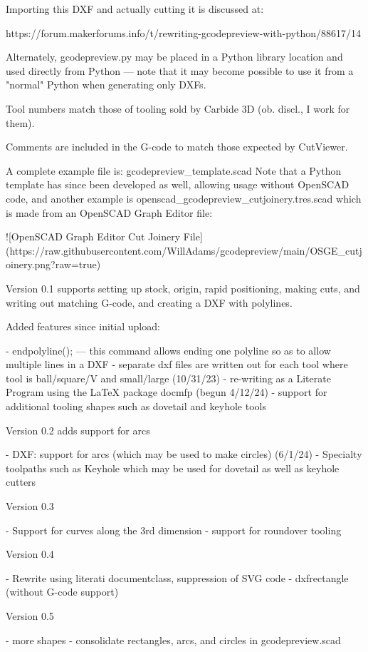 \documentclass{ltxdoc}
\begin{document}
\begin{readme}
Importing this DXF and actually cutting it is discussed at:

https://forum.makerforums.info/t/rewriting-gcodepreview-with-python/88617/14

Alternately, gcodepreview.py may be placed in a Python library location and used directly from Python --- note that it may become possible to use it from a "normal" Python when generating only DXFs.

Tool numbers match those of tooling sold by Carbide 3D (ob. discl., I work for them). 

Comments are included in the G-code to match those expected by CutViewer.

A complete example file is: gcodepreview_template.scad Note that a Python template has since been developed as well, allowing usage without OpenSCAD code, and another example is openscad_gcodepreview_cutjoinery.tres.scad which is made from an OpenSCAD Graph Editor file:

![OpenSCAD Graph Editor Cut Joinery File](https://raw.githubusercontent.com/WillAdams/gcodepreview/main/OSGE_cutjoinery.png?raw=true)

Version 0.1 supports setting up stock, origin, rapid positioning, making cuts, and writing out matching G-code, and creating a DXF with polylines.

Added features since initial upload:

 - endpolyline(); --- this command allows ending one polyline so as to allow multiple lines in a DXF
 - separate dxf files are written out for each tool where tool is ball/square/V and small/large (10/31/23)
 - re-writing as a Literate Program using the LaTeX package docmfp (begun 4/12/24) 
 - support for additional tooling shapes such as dovetail and keyhole tools

Version 0.2 adds support for arcs 

 - DXF: support for arcs (which may be used to make circles) (6/1/24)
 - Specialty toolpaths such as Keyhole which may be used for dovetail as well as keyhole cutters

Version 0.3 

 - Support for curves along the 3rd dimension
 - support for roundover tooling
 
Version 0.4

 - Rewrite using literati documentclass, suppression of SVG code
 - dxfrectangle (without G-code support)

Version 0.5

 - more shapes
 - consolidate rectangles, arcs, and circles in gcodepreview.scad
 

\end{readme}
\end{document}
